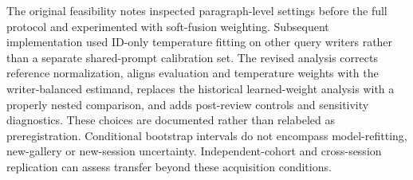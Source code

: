 \documentclass[10pt,a4paper]{article}
\begin{document}
The original feasibility notes inspected paragraph-level settings before the full protocol and experimented with soft-fusion weighting. Subsequent implementation used ID-only temperature fitting on other query writers rather than a separate shared-prompt calibration set. The revised analysis corrects reference normalization, aligns evaluation and temperature weights with the writer-balanced estimand, replaces the historical learned-weight analysis with a properly nested comparison, and adds post-review controls and sensitivity diagnostics. These choices are documented rather than relabeled as preregistration. Conditional bootstrap intervals do not encompass model-refitting, new-gallery or new-session uncertainty. Independent-cohort and cross-session replication can assess transfer beyond these acquisition conditions.
\end{document}
